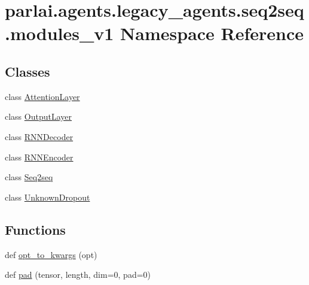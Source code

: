 \hypertarget{namespaceparlai_1_1agents_1_1legacy__agents_1_1seq2seq_1_1modules__v1}{}\section{parlai.\+agents.\+legacy\+\_\+agents.\+seq2seq.\+modules\+\_\+v1 Namespace Reference}
\label{namespaceparlai_1_1agents_1_1legacy__agents_1_1seq2seq_1_1modules__v1}
\subsection*{Classes}
\begin{DoxyCompactItemize}
\item 
class \hyperlink{classparlai_1_1agents_1_1legacy__agents_1_1seq2seq_1_1modules__v1_1_1AttentionLayer}{Attention\+Layer}
\item 
class \hyperlink{classparlai_1_1agents_1_1legacy__agents_1_1seq2seq_1_1modules__v1_1_1OutputLayer}{Output\+Layer}
\item 
class \hyperlink{classparlai_1_1agents_1_1legacy__agents_1_1seq2seq_1_1modules__v1_1_1RNNDecoder}{R\+N\+N\+Decoder}
\item 
class \hyperlink{classparlai_1_1agents_1_1legacy__agents_1_1seq2seq_1_1modules__v1_1_1RNNEncoder}{R\+N\+N\+Encoder}
\item 
class \hyperlink{classparlai_1_1agents_1_1legacy__agents_1_1seq2seq_1_1modules__v1_1_1Seq2seq}{Seq2seq}
\item 
class \hyperlink{classparlai_1_1agents_1_1legacy__agents_1_1seq2seq_1_1modules__v1_1_1UnknownDropout}{Unknown\+Dropout}
\end{DoxyCompactItemize}
\subsection*{Functions}
\begin{DoxyCompactItemize}
\item 
def \hyperlink{namespaceparlai_1_1agents_1_1legacy__agents_1_1seq2seq_1_1modules__v1_af13e3733abb5828b0c0a75d95833441c}{opt\+\_\+to\+\_\+kwargs} (opt)
\item 
def \hyperlink{namespaceparlai_1_1agents_1_1legacy__agents_1_1seq2seq_1_1modules__v1_ab71a48e82c903a3a22ff0b000c461922}{pad} (tensor, length, dim=0, pad=0)
\end{DoxyCompactItemize}


